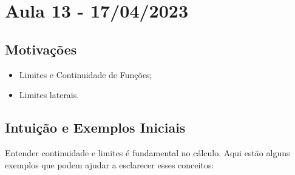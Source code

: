 \documentclass[Analysis/analysis_notes.tex]{subfiles}
\begin{document}
\section{Aula 13 - 17/04/2023}
\subsection{Motiva\c c\~oes}
\begin{itemize}
	\item Limites e Continuidade de Fun\c c\~oes;
	\item Limites laterais.
\end{itemize}
\subsection{Intui\c c\~ao e Exemplos Iniciais}
Entender continuidade e limites é fundamental no cálculo. Aqui estão alguns exemplos que podem ajudar a esclarecer esses conceitos:
\end{document}
